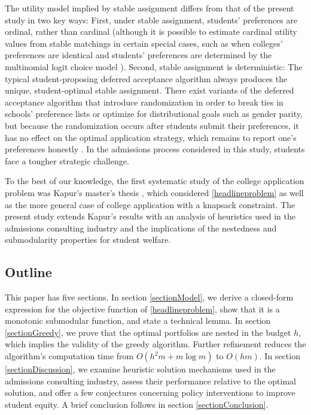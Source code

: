 The utility model implied by stable assignment differs from that of the present study in two key ways: First, under stable assignment, students' preferences are ordinal, rather than cardinal (although it is possible to estimate cardinal utility values from stable matchings in certain special cases, such as when colleges' preferences are identical and students' preferences are determined by the multinomial logit choice model \citep{kapur2021}). Second, stable assignment is deterministic: The typical student-proposing deferred acceptance algorithm always produces the unique, student-optimal stable assignment. There exist variants of the deferred acceptance algorithm that introduce randomization in order to break ties in schools' preference lists or optimize for distributional goals such as gender parity, but because the randomization occurs after students submit their preferences, it has no effect on the optimal application strategy, which remains to report one's preferences honestly \citep{ashlagiandnikzad2020,bodohcreed2020}. In the admissions process considered in this study, students face a tougher strategic challenge.

To the best of our knowledge, the first systematic study of the college application problem was Kapur's master's thesis \citep{kapur2022}, which considered \eqref{headlineproblem} as well as the more general case of college application with a knapsack constraint. The present study extends Kapur's results with an analysis of heuristics used in the admissions consulting industry and the implications of the nestedness and submodularity properties for student welfare.

\subsection{Outline}

This paper has five sections. In section \ref{sectionModel}, we derive a closed-form expression for the objective function of \eqref{headlineproblem}, show that it is a monotonic submodular function, and state a technical lemma. In section \ref{sectionGreedy}, we prove that the optimal portfolios are nested in the budget $h$, which implies the validity of the greedy algorithm. Further refinement reduces the algorithm's computation time from $O(h^2 m + m\log m)$ to $O(hm)$. In section \ref{sectionDiscussion}, we examine heuristic solution mechanisms used in the admissions consulting industry, assess their performance relative to the optimal solution, and offer a few conjectures concerning policy interventions to improve student equity. A brief conclusion follows in section \ref{sectionConclusion}.







